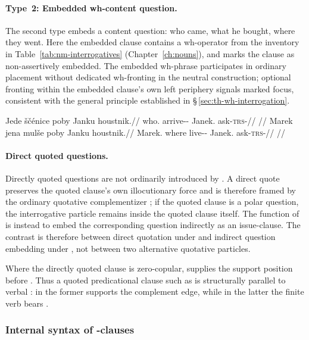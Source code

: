 \paragraph{Type~2: Embedded wh-content question.}
The second type embeds a content question: who came, what he bought, where they
went. Here the embedded clause contains a wh-operator from the inventory in
Table~\ref{tab:nm-interrogatives} (Chapter~\ref{ch:nouns}), and  marks
the clause as non-assertively embedded. The embedded wh-phrase participates in ordinary placement without dedicated
wh-fronting in the neutral construction; optional fronting within the embedded
clause's own left periphery signals marked focus, consistent with the general
principle established in §\,\ref{sec:th-wh-interrogation}.

\pex
\a
\begingl
\gla Jede ščénice poby Janku houstnik.//
\glb who.\Dir{} arrive-\Pf{}-\Lnk{} \Compl{} Janek.\Trs{} ask-\textsc{trs}-\Pf{}//
\glft {} //
\endgl
\a
\begingl
\gla Marek jena mulše poby Janku houstnik.//
\glb Marek.\Dir{} where live-\Cont{}-\Lnk{} \Compl{} Janek.\Trs{} ask-\textsc{trs}-\Pf{}//
\glft {} //
\endgl
\xe

\paragraph{Direct quoted questions.}
Directly quoted questions are not ordinarily introduced by . A direct
quote preserves the quoted clause's own illocutionary force and is therefore
framed by the ordinary quotative complementizer ; if the quoted clause
is a polar question, the interrogative particle  remains inside the
quoted clause itself. The function of  is instead to embed the
corresponding question indirectly as an issue-clause. The contrast is therefore
between direct quotation under  and indirect question embedding under
, not between two alternative quotative particles.

Where the directly quoted clause is zero-copular,  supplies the support
position before . Thus a quoted predicational clause such as
 is structurally parallel to verbal
: in the former  supports the complement edge,
while in the latter the finite verb bears .

\subsubsection{Internal syntax of -clauses}

